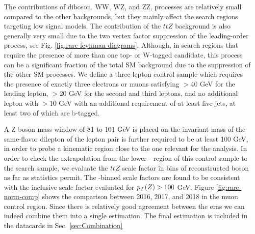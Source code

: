 The contributions of diboson, WW, WZ, and ZZ, processes are relatively small compared to the other backgrounds, but they mainly affect the search regions targeting low \dm{} signal models. The contribution of the $ttZ$ background is also generally very small due to the two vertex factor suppression of the leading-order process, see Fig. \ref{fig:rare-feynman-diagrams}. Although, in search regions that require the presence of more than one top- or W-tagged candidate, this process can be a significant fraction of the total SM background due to the suppression of the other SM processes. We define a three-lepton control sample which requires the presence of exactly three electrons or muons satisfying \pt$>40$ GeV for the leading lepton, \pt$>20$ GeV for the second and third leptons, and no additional lepton with \pt$>10$ GeV with an additional requirement of at least five jets, at least two of which are b-tagged. 

A Z boson mass window of 81 to 101 GeV is placed on the invariant mass of the same-flavor dilepton \pt{} of the lepton pair is further required to be at least 100 GeV, in order to probe a kinematic region close to the one relevant for the analysis. In order to check the extrapolation from the lower \Z-\pt{} region of this control sample to the search sample, we evaluate the $ttZ$ scale factor in bins of reconstructed \Z{} boson \pt{} as far as statistics permit. The \pt-binned scale factors are found to be consistent with the inclusive scale factor evaluated for $p_{T}(Z)>100$ GeV. Figure \ref{fig:rare-norm-comp} shows the comparison between 2016, 2017, and 2018 in the muon control region. Since there is relatively good agreement between the eras we can indeed combine them into a single estimation. The final estimation is included in the datacards in Sec. \ref{sec:Combination}


